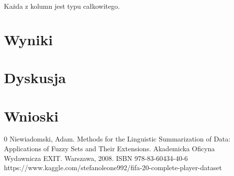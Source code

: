 \documentclass{classrep}
\begin{document}
	Każda z kolumn jest typu całkowitego.
	
	
	\section{Wyniki} %
	
	\section{Dyskusja} %
	
	\section{Wnioski}
		
	
	\begin{thebibliography} {0}
		 Niewiadomski, Adam. Methods for the Linguistic Summarization of Data: Applications of Fuzzy Sets and Their Extensions. Akademicka Oficyna Wydawnicza EXIT. Warszawa, 2008. ISBN 978-83-60434-40-6
		 https://www.kaggle.com/stefanoleone992/fifa-20-complete-player-dataset
		
	\end{thebibliography}
\end{document}
